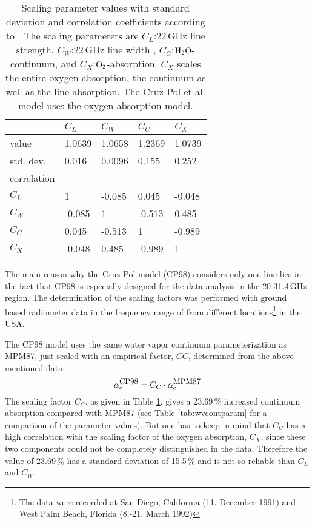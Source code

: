 \begin{table}[!htb]
\begin{center}
\begin{tabular}{lllll}
\hline
            & $C_L$ & $C_W$ & $C_C$ & $C_X$ \\
\hline
value       & 1.0639 & 1.0658 & 1.2369 & 1.0739\\
std. dev.   & 0.016  & 0.0096 & 0.155  & 0.252\\
\hline
correlation & &&&\\
$C_L$       & 1      & -0.085 & 0.045  & -0.048\\
$C_W$       & -0.085 & 1      & -0.513 &  0.485\\
$C_C$       & 0.045  & -0.513 & 1      & -0.989\\
$C_X$       & -0.048 & 0.485  & -0.989 & 1\\
\hline
\end{tabular}
\end{center}
\caption{Scaling parameter values with standard deviation and 
  correlation coefficients according to \citep{cruzpol:98}.
  The scaling parameters are $C_L$:22\,GHz line strength, 
  $C_W$:22\,GHz line width , $C_C$:$\mbox{H}_2\mbox{O}$-continuum, and 
  $C_X$:$\mbox{O}_2$-absorption. $C_X$ scales the entire oxygen absorption, 
  the continuum as well as the line absorption. The Cruz-Pol et al.
  model uses the \cite{pwr:93} oxygen absorption model.}
\label{tab:cp_orr}
\end{table}

The main reason why the Cruz-Pol model (CP98) considers only one line
lies in the fact that CP98 is especially designed for the data analysis
in the 20-31.4\,GHz region. The determination of the scaling factors was 
performed with ground based radiometer data in the frequency range of
from different locations\footnote{The data were recorded at San Diego, 
California (11. December 1991) and West Palm Beach, Florida 
(8.-21. March 1992)} in the USA.


\label{levele:cp98_h2ocont}
The CP98 model uses the same water vapor continuum 
parameterization as MPM87, just scaled with an empirical 
factor, $CC$, determined from the above mentioned data:
\begin{equation}
 \label{eq:cp98_cont_scaling}
 \alpha^{\mbox{\rm \small CP98}}_{\rm c} = C_C \cdot \alpha^{\mbox{\rm \small MPM87}}_{\rm c} 
\end{equation}
The scaling factor $C_C$, as given in Table \ref{tab:cp_orr}, 
gives a 23.69\,\% increased continuum absorption compared 
with MPM87 (see Table \ref{tab:wvcontparam} for a comparison of the 
parameter values). But one has to keep in mind that $C_C$ has a 
high correlation with the scaling factor of the oxygen 
absorption, $C_X$, since these two components could not 
be completely distinguished in the data. Therefore the 
value of 23.69\,\% has a standard deviation of 15.5\,\% 
and is not so reliable than $C_L$ and $C_W$.





